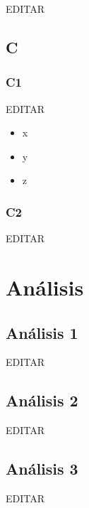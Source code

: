 \documentclass[preprint,12pt]{elsarticle}
\begin{document}
EDITAR\\

\subsection{\textbf{C}}

\subsubsection{\textbf{C1}}

EDITAR\\

\begin{itemize}

\item x
\item y
\item z

\end{itemize}
\subsubsection{\textbf{C2}}

EDITAR\\


 



\section{Análisis}

\subsection{\textbf{Análisis 1}}
EDITAR\\

\subsection{\textbf{Análisis 2}}
EDITAR\\

\subsection{\textbf{Análisis 3}}
EDITAR\\
\end{document}
